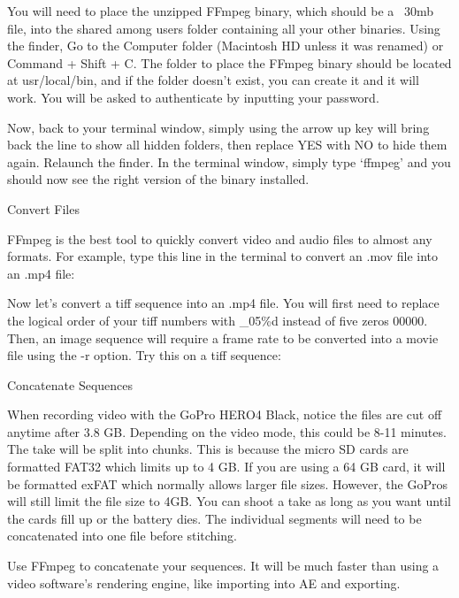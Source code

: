 \begin{fullwidth}
You will need to place the unzipped FFmpeg binary, which should be a ~30mb file, into the shared among users folder containing all your other binaries. Using the finder, Go to the Computer folder (Macintosh HD unless it was renamed) or Command + Shift + C. The folder to place the FFmpeg binary should be located at usr/local/bin, and if the folder doesn’t exist, you can create it and it will work. You will be asked to authenticate by inputting your password. 

Now, back to your terminal window, simply using the arrow up key will bring back the line to show all hidden folders, then replace YES with NO to hide them again. Relaunch the finder. In the terminal window, simply type ‘ffmpeg’ and you should now see the right version of the binary installed.

{\large Convert Files \par}

FFmpeg is the best tool to quickly convert video and audio files to almost any formats. For example, type this line in the terminal to convert an .mov file into an .mp4 file:


Now let’s convert a tiff sequence into an .mp4 file. You will first need to replace the logical order of your tiff numbers with \_05\%d instead of five zeros 00000. Then, an image sequence will require a frame rate to be converted into a movie file using the -r option. Try this on a tiff sequence:


{\large Concatenate Sequences \par}

When recording video with the GoPro HERO4 Black, notice the files are cut off anytime after 3.8 GB. Depending on the video mode, this could be 8-11 minutes. The take will be split into chunks. This is because the micro SD cards are formatted FAT32 which limits up to 4 GB. If you are using a 64 GB card, it will be formatted exFAT which normally allows larger file sizes. However, the GoPros will still limit the file size to 4GB. You can shoot a take as long as you want until the cards fill up or the battery dies. The individual segments will need to be concatenated into one file before stitching.

Use FFmpeg to concatenate your sequences. It will be much faster than using a video software’s rendering engine, like importing into AE and exporting.


\end{fullwidth}
